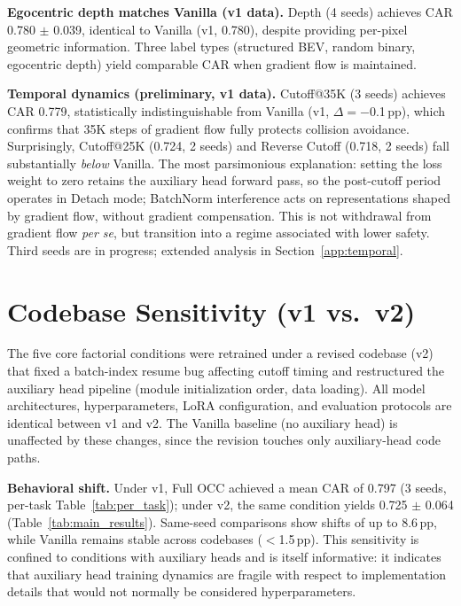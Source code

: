 \textbf{Egocentric depth matches Vanilla (v1 data).} Depth (4 seeds) achieves CAR 0.780 $\pm$ 0.039, identical to Vanilla (v1, 0.780), despite providing per-pixel geometric information. Three label types (structured BEV, random binary, egocentric depth) yield comparable CAR when gradient flow is maintained.

\textbf{Temporal dynamics (preliminary, v1 data).} Cutoff@35K (3 seeds) achieves CAR 0.779, statistically indistinguishable from Vanilla (v1, $\Delta = -$0.1\,pp), which confirms that 35K steps of gradient flow fully protects collision avoidance. Surprisingly, Cutoff@25K (0.724, 2 seeds) and Reverse Cutoff (0.718, 2 seeds) fall substantially \emph{below} Vanilla. The most parsimonious explanation: setting the loss weight to zero retains the auxiliary head forward pass, so the post-cutoff period operates in Detach mode; BatchNorm interference acts on representations shaped by gradient flow, without gradient compensation. This is not withdrawal from gradient flow \emph{per se}, but transition into a regime associated with lower safety. Third seeds are in progress; extended analysis in Section~\ref{app:temporal}.

\section{Codebase Sensitivity (v1 vs.\ v2)}
\label{app:codebase}

The five core factorial conditions were retrained under a revised codebase (v2) that fixed a batch-index resume bug affecting cutoff timing and restructured the auxiliary head pipeline (module initialization order, data loading). All model architectures, hyperparameters, LoRA configuration, and evaluation protocols are identical between v1 and v2. The Vanilla baseline (no auxiliary head) is unaffected by these changes, since the revision touches only auxiliary-head code paths.

\textbf{Behavioral shift.} Under v1, Full OCC achieved a mean CAR of 0.797 (3 seeds, per-task Table~\ref{tab:per_task}); under v2, the same condition yields 0.725 $\pm$ 0.064 (Table~\ref{tab:main_results}). Same-seed comparisons show shifts of up to 8.6\,pp, while Vanilla remains stable across codebases ($<$1.5\,pp). This sensitivity is confined to conditions with auxiliary heads and is itself informative: it indicates that auxiliary head training dynamics are fragile with respect to implementation details that would not normally be considered hyperparameters.

